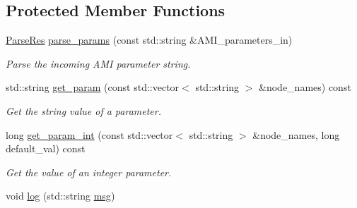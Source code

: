 \subsection*{Protected Member Functions}
\begin{DoxyCompactItemize}
\item 
\hyperlink{amimodel_8h_a5fbe8bcd249e7070ded2dadafa23ec1f}{Parse\+Res} \hyperlink{class_a_m_i_model_ad99c8cb946fe1d0b2197253130969368}{parse\+\_\+params} (const std\+::string \&A\+M\+I\+\_\+parameters\+\_\+in)
\begin{DoxyCompactList}\small\item\em Parse the incoming A\+M\+I parameter string. \end{DoxyCompactList}\item 
std\+::string \hyperlink{class_a_m_i_model_a62437e97ce61c76f4b9af78144385416}{get\+\_\+param} (const std\+::vector$<$ std\+::string $>$ \&node\+\_\+names) const 
\begin{DoxyCompactList}\small\item\em Get the string value of a parameter. \end{DoxyCompactList}\item 
long \hyperlink{class_a_m_i_model_a55b68d8a68be34f672d53968484225e1}{get\+\_\+param\+\_\+int} (const std\+::vector$<$ std\+::string $>$ \&node\+\_\+names, long default\+\_\+val) const 
\begin{DoxyCompactList}\small\item\em Get the value of an integer parameter. \end{DoxyCompactList}\item 
void \hyperlink{class_a_m_i_model_a1e8cbd58a09b712dcf76a12f439bce30}{log} (std\+::string \hyperlink{class_a_m_i_model_ae65d47400fd3736682c229dab31392ad}{msg})
\end{DoxyCompactItemize}
